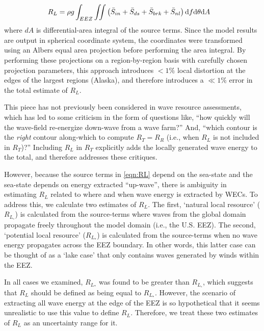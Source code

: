 \begin{align}
  R_L &= \rho g \int_{EEZ}\iint \left ( \bar{S}_{in} + \bar{S}_{ds} + \bar{S}_{brk} + \bar{S}_{nl} \right ) \mathrm{d} f \mathrm{d} \theta \mathrm{d} A
\label{eqn:RL}
\end{align}
where $dA$ is differential-area integral of the source terms. Since the model results are output in spherical coordinate system, the coordinates were transformed using an Albers equal area projection before performing the area integral. By performing these projections on a region-by-region basis with carefully chosen projection parameters, this approach introduces $<1\% $ local distortion at the edges of the largest regions (Alaska), and therefore introduces a $\ll 1\%$ error in the total estimate of $R_L$.

This piece has not previously been considered in wave resource assessments, which has led to some criticism in the form of questions like, ``how quickly will the wave-field re-energize down-wave from a wave farm?''  And, ``which contour is the {\em right} contour along-which to compute $R_T = R_R$ (i.e., when $R_L$ is not included in $R_T$)?'' Including $R_L$ in $R_T$ explicitly adds the locally generated wave energy to the total, and therefore addresses these critiques. 

However, because the source terms in \eqref{eqn:RL} depend on the sea-state and the sea-state depends on energy extracted ``up-wave'', there is ambiguity in estimating $R_L$ related to where and when wave energy is extracted by WECs. To address this, we calculate two estimates of $R_L$. The first, `natural local resource' ($R_{L_\circ}$) is calculated from the source-terms where waves from the global domain propagate freely throughout the model domain (i.e., the U.S. EEZ). The second, `potential local resource' ($R_{L_*}$) is calculated from the source-terms when no wave energy propagates across the EEZ boundary. In other words, this latter case can be thought of as a `lake case' that only contains waves generated by winds within the EEZ. 

In all cases we examined, $R_{L_*}$ was found to be greater than $R_{L_\circ}$, which suggests that $R_L$ should be defined as being equal to $R_{L_*}$. However, the scenario of extracting all wave energy at the edge of the EEZ is so hypothetical that it seems unrealistic to use this value to define $R_L$. Therefore, we treat these two estimates of $R_L$ as an uncertainty range for it.

